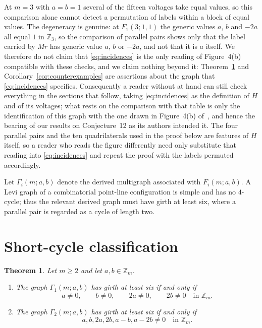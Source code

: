 \documentclass[11pt]{amsart}
\newtheorem{theorem}{Theorem}
\theoremstyle{remark}
\newcommand{\Z}{\mathbb Z}
\newcommand{\GammaOne}{\Gamma_1(m;a,b)}
\newcommand{\GammaTwo}{\Gamma_2(m;a,b)}
\begin{document}
At $m=3$ with $a=b=1$ several of the fifteen voltages take equal values, so
this comparison alone cannot detect a permutation of labels within a block of
equal values. The degeneracy is genuine: at $F_1(3;1,1)$ the generic values
$a$, $b$ and $-2a$ all equal $1$ in $\Z_3$, so the comparison of parallel
pairs shows only that the label carried by $Mr$ has generic value $a$, $b$ or
$-2a$, and not that it is $a$ itself. We therefore do not claim that
\eqref{eq:incidences} is the only reading of Figure~4(b) compatible with these
checks, and we claim nothing beyond it: Theorem~\ref{thm:classification} and
Corollary~\ref{cor:counterexamples} are assertions about the graph that
\eqref{eq:incidences} specifies. Consequently a reader without
\cite[Table~1]{BGP} at hand can still check everything in the sections that
follow, taking \eqref{eq:incidences} as the definition of $H$ and of its
voltages; what rests on the comparison with that table is only the
identification of this graph with the one drawn in Figure~4(b)
of~\cite{BGP}, and hence the bearing of our results on Conjecture~12 as its
authors intended it. The four parallel pairs and the ten
quadrilaterals used in the proof below are features of $H$ itself, so a reader
who reads the figure differently need only substitute that reading into
\eqref{eq:incidences} and repeat the proof with the labels permuted
accordingly.

\medskip
Let $\Gamma_i(m;a,b)$ denote the derived multigraph associated with
$F_i(m;a,b)$. A Levi graph of a combinatorial point-line configuration is
simple and has no $4$-cycle; thus the relevant derived graph must have
girth at least six, where a parallel pair is regarded as a cycle of length
two.

\section{Short-cycle classification}

\begin{theorem}\label{thm:classification}
Let $m\ge2$ and let $a,b\in\Z_m$.
\begin{enumerate}
\item
The graph $\GammaOne$ has girth at least six if and only if
\[
a\ne0,\qquad b\ne0,\qquad 2a\ne0,\qquad 2b\ne0
\quad\text{in }\Z_m.
\]
\item
The graph $\GammaTwo$ has girth at least six if and only if
\[
a,b,2a,2b,a-b,a-2b\ne0
\quad\text{in }\Z_m.
\]
\end{enumerate}
\end{theorem}
\end{document}
